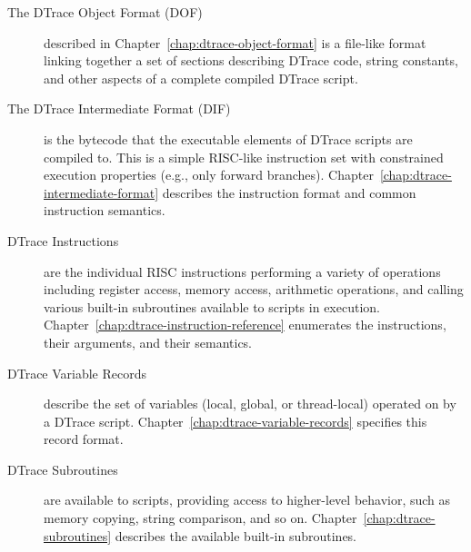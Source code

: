 \begin{description}
\item[The DTrace Object Format (DOF)] described in
  Chapter~\ref{chap:dtrace-object-format} is a file-like format linking
  together a set of sections describing DTrace code, string constants, and
  other aspects of a complete compiled DTrace script.

\item[The DTrace Intermediate Format (DIF)] is the bytecode that the
  executable elements of DTrace scripts are compiled to.
  This is a simple RISC-like instruction set with constrained execution
  properties (e.g., only forward branches).
  Chapter~\ref{chap:dtrace-intermediate-format} describes the instruction
  format and common instruction semantics.

\item[DTrace Instructions] are the individual RISC instructions performing
  a variety of operations including register access, memory access, arithmetic
  operations, and calling various built-in subroutines available to scripts in
  execution.
  Chapter~\ref{chap:dtrace-instruction-reference} enumerates the instructions,
  their arguments, and their semantics.

\item[DTrace Variable Records] describe the set of variables (local, global,
  or thread-local) operated on by a DTrace script.
  Chapter~\ref{chap:dtrace-variable-records} specifies this record format.

\item[DTrace Subroutines] are available to scripts, providing access to
  higher-level behavior, such as memory copying, string comparison, and so on.
  Chapter~\ref{chap:dtrace-subroutines} describes the available built-in
  subroutines.

\end{description}
